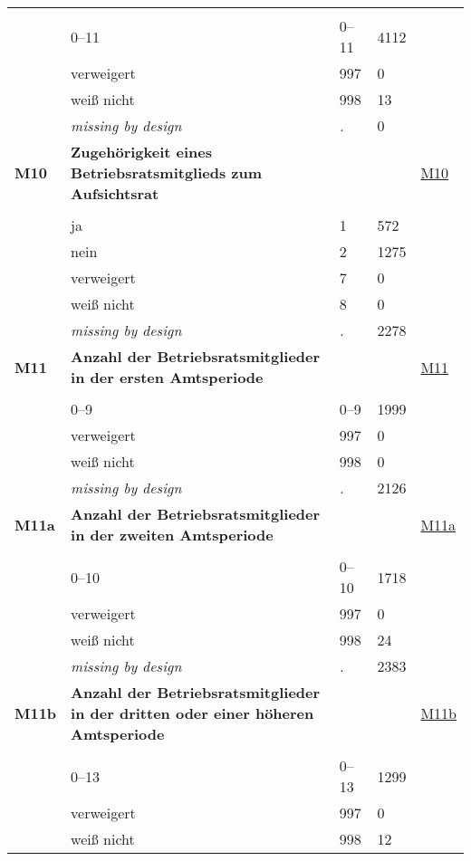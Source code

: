 \begin{longtable}{| L{2.65cm} | L{8cm} | C{1.5cm} | R{1.25cm} | C{2.25cm}  |}
   &  &  &  &  \\ 
   & 0--11 & 0--11 & 4112 &  \\ 
   & verweigert & 997 & 0 &  \\ 
   & weiß nicht & 998 & 13 &  \\ 
   & \textit{missing by design} & \textit{.} & 0 &  \\ 
   \midrule
\textbf{M10}\label{var:M10} & \textbf{Zugehörigkeit eines Betriebsratsmitglieds zum Aufsichtsrat} &  &  & \hyperref[M10]{M10} \\ 
   &  &  &  &  \\ 
   & ja & 1 & 572 &  \\ 
   & nein & 2 & 1275 &  \\ 
   & verweigert & 7 & 0 &  \\ 
   & weiß nicht & 8 & 0 &  \\ 
   & \textit{missing by design} & \textit{.} & 2278 &  \\ 
   \midrule
\textbf{M11}\label{var:M11} & \textbf{Anzahl der Betriebsratsmitglieder in der ersten Amtsperiode} &  &  & \hyperref[M11]{M11} \\ 
   &  &  &  &  \\ 
   & 0--9 & 0--9 & 1999 &  \\ 
   & verweigert & 997 & 0 &  \\ 
   & weiß nicht & 998 & 0 &  \\ 
   & \textit{missing by design} & \textit{.} & 2126 &  \\ 
   \midrule
\textbf{M11a}\label{var:M11a} & \textbf{Anzahl der Betriebsratsmitglieder in der zweiten Amtsperiode} &  &  & \hyperref[M11a]{M11a} \\ 
   &  &  &  &  \\ 
   & 0--10 & 0--10 & 1718 &  \\ 
   & verweigert & 997 & 0 &  \\ 
   & weiß nicht & 998 & 24 &  \\ 
   & \textit{missing by design} & \textit{.} & 2383 &  \\ 
   \midrule
\textbf{M11b}\label{var:M11b} & \textbf{Anzahl der Betriebsratsmitglieder in der dritten oder einer höheren Amtsperiode} &  &  & \hyperref[M11b]{M11b} \\ 
   &  &  &  &  \\ 
   & 0--13 & 0--13 & 1299 &  \\ 
   & verweigert & 997 & 0 &  \\ 
   & weiß nicht & 998 & 12 &  \\ 

\end{longtable}
